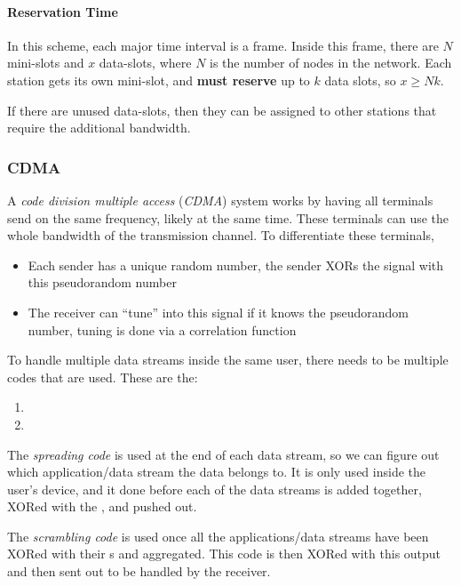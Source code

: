 \paragraph{Reservation Time}\label{par:TDMA_Reservation_Time}
In this scheme, each major time interval is a frame.
Inside this frame, there are $N$ mini-slots and $x$ data-slots, where $N$ is the number of nodes in the network.
Each station gets its own mini-slot, and \textbf{must reserve} up to $k$ data slots, so $x \geq Nk$.

If there are unused data-slots, then they can be assigned to other stations that require the additional bandwidth.

\subsubsection{CDMA}\label{subsubsec:CDMA}
\begin{definition}\label{def:CDMA}
  A \emph{code division multiple access} (\emph{CDMA}) system works by having all terminals send on the same frequency, likely at the same time.
  These terminals can use the whole bandwidth of the transmission channel.
  To differentiate these terminals,
  \begin{itemize}[noitemsep]
  \item Each sender has a unique random number, the sender XORs the signal with this pseudorandom number
  \item The receiver can ``tune'' into this signal if it knows the pseudorandom number, tuning is done via a correlation function
  \end{itemize}
\end{definition}

To handle multiple data streams inside the same user, there needs to be multiple codes that are used.
These are the:
\begin{enumerate}[noitemsep]
\item {}
\item {}
\end{enumerate}

\begin{definition}\label{def:Spreading_Code}
  The \emph{spreading code} is used at the end of each data stream, so we can figure out which application/data stream the data belongs to.
  It is only used inside the user's device, and it done before each of the data streams is added together, XORed with the , and pushed out.
\end{definition}

\begin{definition}\label{def:Scrambling_Code}
  The \emph{scrambling code} is used once all the applications/data streams have been XORed with their s and aggregated.
  This code is then XORed with this output and then sent out to be handled by the receiver.
\end{definition}

